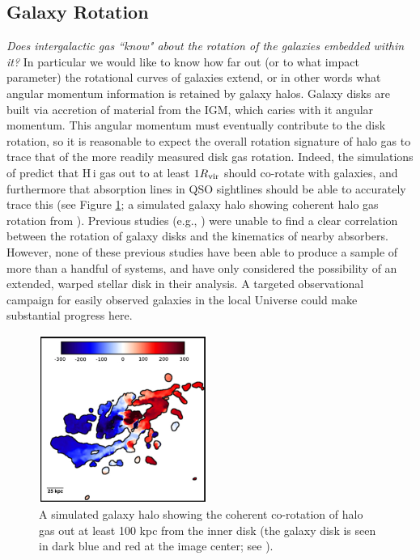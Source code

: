 \documentclass[twocolumn,tighten]{aastex62}
\newcommand{\HI}{\mbox{H\,{\sc i}} }
\newcommand{\II}{\,{\sc ii}}
\newcommand{\VI}{\,{\sc vi}}
\begin{document}

\subsection{Galaxy Rotation}
\emph{Does intergalactic gas ``know" about the rotation of the galaxies embedded within it?} In particular we would like to know how far out (or to what impact parameter) the rotational curves of galaxies extend, or in other words what angular momentum information is retained by galaxy halos. Galaxy disks are built via accretion of material from the IGM, which caries with it angular momentum. This angular momentum must eventually contribute to the disk rotation, so it is reasonable to expect the overall rotation signature of halo gas to trace that of the more readily measured disk gas rotation. Indeed, the simulations of \cite{stewart2011a, stewart2011b, stewart2013} predict that \HI gas out to at least $1 R_{\rm vir}$ should co-rotate with galaxies, and furthermore that absorption lines in QSO sightlines should be able to accurately trace this (see Figure \ref{stewart_rotation}; a simulated galaxy halo showing coherent halo gas rotation from \citealt{stewart2011a}). Previous studies (e.g., \citealt{steidel2002, cote2005, wakker2009, kacprzak2011_kinematics}) were unable to find a clear correlation between the rotation of galaxy disks and the kinematics of nearby absorbers. However, none of these previous studies have been able to produce a sample of more than a handful of systems, and have only considered the possibility of an extended, warped stellar disk in their analysis. A targeted observational campaign for easily observed galaxies in the local Universe could make substantial progress here.


\begin{figure}[t!]
        \centering
        \vspace{0pt}
        \includegraphics[width=0.49\textwidth]{stewart2011_comoving_gas.jpg}
        \caption{\small{A simulated galaxy halo showing the coherent co-rotation of halo gas out at least 100 kpc from the inner disk (the galaxy disk is seen in dark blue and red at the image center; see \cite{stewart2011a}).}}
        \vspace{5pt}
        \label{stewart_rotation}
\end{figure}
\end{document}
